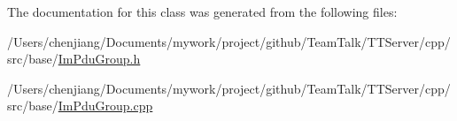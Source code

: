 The documentation for this class was generated from the following files\+:\begin{DoxyCompactItemize}
\item 
/\+Users/chenjiang/\+Documents/mywork/project/github/\+Team\+Talk/\+T\+T\+Server/cpp/src/base/\hyperlink{_im_pdu_group_8h}{Im\+Pdu\+Group.\+h}\item 
/\+Users/chenjiang/\+Documents/mywork/project/github/\+Team\+Talk/\+T\+T\+Server/cpp/src/base/\hyperlink{_im_pdu_group_8cpp}{Im\+Pdu\+Group.\+cpp}\end{DoxyCompactItemize}
